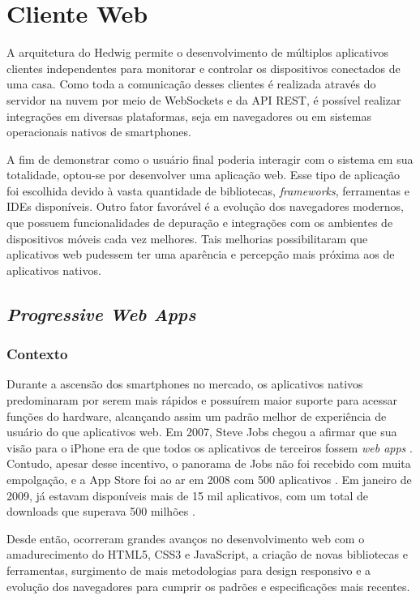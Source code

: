 \section{Cliente Web}
\label{archweb}
A arquitetura do Hedwig permite o desenvolvimento de múltiplos aplicativos clientes independentes para monitorar e controlar os dispositivos conectados de uma casa. Como toda a comunicação desses clientes é realizada através do servidor na nuvem por meio de WebSockets e da API REST, é possível realizar integrações em diversas plataformas, seja em navegadores ou em sistemas operacionais nativos de smartphones.

A fim de demonstrar como o usuário final poderia interagir com o sistema em sua totalidade, optou-se por desenvolver uma aplicação web. Esse tipo de aplicação foi escolhida devido à vasta quantidade de bibliotecas, \emph{frameworks}, ferramentas e IDEs disponíveis. Outro fator favorável é a evolução dos navegadores modernos, que possuem funcionalidades de depuração e integrações com os ambientes de dispositivos móveis cada vez melhores. Tais melhorias possibilitaram que aplicativos web pudessem ter uma aparência e percepção mais próxima aos de aplicativos nativos.

\subsection{\emph{Progressive Web Apps}}

\subsubsection{Contexto}
Durante a ascensão dos smartphones no mercado, os aplicativos nativos predominaram por serem mais rápidos e possuírem maior suporte para acessar funções do hardware, alcançando assim um padrão melhor de experiência de usuário do que aplicativos web. Em 2007, Steve Jobs chegou a afirmar que sua visão para o iPhone era de que todos os aplicativos de terceiros fossem \textit{web apps} \cite{9to5mac}. Contudo, apesar desse incentivo, o panorama de Jobs não foi recebido com muita empolgação, e a App Store foi ao ar em 2008 com 500 aplicativos \cite{ricker}. Em janeiro de 2009, já estavam disponíveis mais de 15 mil aplicativos, com um total de downloads que superava 500 milhões \cite{myslewski}.

Desde então, ocorreram grandes avanços no desenvolvimento web com o amadurecimento do HTML5, CSS3 e JavaScript, a criação de novas bibliotecas e ferramentas, surgimento de mais metodologias para design responsivo e a evolução dos navegadores para cumprir os padrões e especificações mais recentes.

